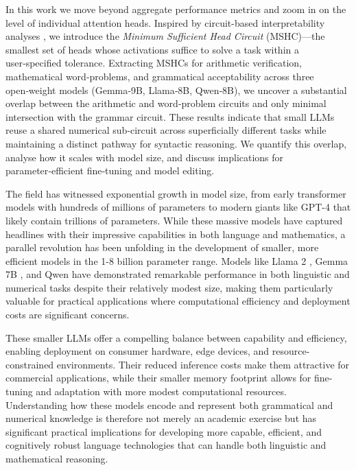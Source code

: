 \documentclass{article}
\begin{document}
In this work we move beyond aggregate performance metrics and zoom in on the level of individual attention heads. Inspired by circuit-based interpretability analyses \citep{olah2020zoom, elhage2021superposition}, we introduce the \emph{Minimum Sufficient Head Circuit} (MSHC)—the smallest set of heads whose activations suffice to solve a task within a user‑specified tolerance. Extracting MSHCs for arithmetic verification, mathematical word‑problems, and grammatical acceptability across three open‑weight models (Gemma‑9B, Llama‑8B, Qwen‑8B), we uncover a substantial overlap between the arithmetic and word‑problem circuits and only minimal intersection with the grammar circuit. These results indicate that small LLMs reuse a shared numerical sub‑circuit across superficially different tasks while maintaining a distinct pathway for syntactic reasoning. We quantify this overlap, analyse how it scales with model size, and discuss implications for parameter‑efficient fine‑tuning and model editing.

The field has witnessed exponential growth in model size, from early transformer models with hundreds of millions of parameters \citep{vaswani2017attention} to modern giants like GPT-4 \citep{openai2023gpt4} that likely contain trillions of parameters. While these massive models have captured headlines with their impressive capabilities in both language and mathematics, a parallel revolution has been unfolding in the development of smaller, more efficient models in the 1-8 billion parameter range. Models like Llama 2 \citep{touvron2023llama2}, Gemma 7B \citep{jiang2023mistral}, and Qwen \citep{bai2023qwen} have demonstrated remarkable performance in both linguistic and numerical tasks despite their relatively modest size, making them particularly valuable for practical applications where computational efficiency and deployment costs are significant concerns.

These smaller LLMs offer a compelling balance between capability and efficiency, enabling deployment on consumer hardware, edge devices, and resource-constrained environments. Their reduced inference costs make them attractive for commercial applications, while their smaller memory footprint allows for fine-tuning and adaptation with more modest computational resources. Understanding how these models encode and represent both grammatical and numerical knowledge is therefore not merely an academic exercise but has significant practical implications for developing more capable, efficient, and cognitively robust language technologies that can handle both linguistic and mathematical reasoning.
\end{document}
